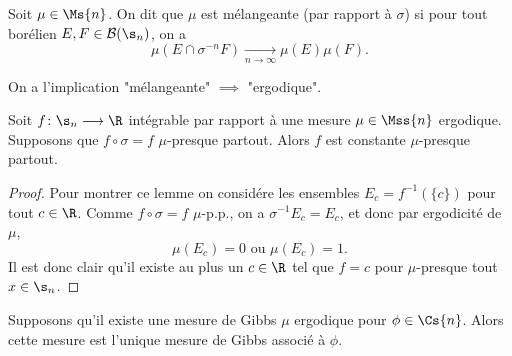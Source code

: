   \begin{definition}
    \label{def:mixing}
    \leanok
    Soit $\mu \in \Ms{n}$. On dit que $\mu$ est mélangeante (par rapport à $\sigma$) si pour tout borélien $E, F \in \mathcal{B}(\s_n)$, on a
	$$\mu(E\cap\sigma^{-n}F) \underset{n\to\infty}{\longrightarrow} \mu(E)\mu(F).$$
  \end{definition}

  \begin{remark}
    On a l'implication "mélangeante" $\implies$ "ergodique".
  \end{remark}

  \begin{lemma}
    \label{lem:sig_inv_imp_cst}
    \leanok
    Soit $f \colon \s_n \longrightarrow \R$ intégrable par rapport à une mesure $\mu \in \Mss{n}$ ergodique.
    Supposons que $f \circ \sigma = f$ $\mu$-presque partout.
    Alors $f$ est constante $\mu$-presque partout.
  \end{lemma}

  \begin{proof}
    Pour montrer ce lemme on considére les ensembles $E_c = f^{-1}(\{c\})$ pour tout $c\in\R$.
    Comme $f \circ \sigma = f$ $\mu$-p.p., on a $\sigma^{-1}E_c = E_c$, et donc par ergodicité de $\mu$,
    $$\mu(E_c) = 0 \text{ ou } \mu(E_c) = 1.$$
    Il est donc clair qu'il existe au plus un $c\in\R$ tel que $f = c$ pour $\mu$-presque tout $x \in \s_n$.
  \end{proof}

  \begin{proposition}
    \label{prop:unique}
    \leanok
    Supposons qu'il existe une mesure de Gibbs $\mu$ ergodique pour $\phi \in \Cs{n}$.
    Alors cette mesure est l'unique mesure de Gibbs associé à $\phi$.
  \end{proposition}

